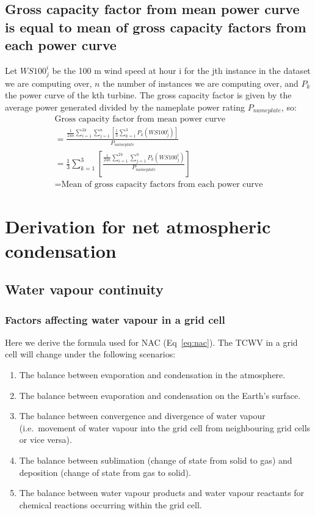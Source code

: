 \subsection[Gross capacity factor and mean power curve]{Gross capacity factor from mean power curve is equal to mean of gross capacity factors from each power curve}

Let $WS100^i_j$ be the 100 m wind speed at hour i for the jth instance in the dataset we are computing over, $n$ the number of instances we are computing over, and $P_k$ the power curve of the kth turbine. The gross capacity factor is given by the average power generated divided by the nameplate power rating $P_{nameplate}$, so:
\begin{eqnarray}
	\mbox{Gross capacity factor from mean power curve} \\
	= \frac{\frac{1}{24n} \sum_{i=1}^{24} \sum_{j=1}^{n} \left[\frac{1}{3} \sum_{k=1}^{3} P_k (WS100^i_j) \right]}{P_{nameplate}} \nonumber \\
	= \frac{1}{3} \sum_{k=1}^{3} \left[ \frac{\frac{1}{24n} \sum_{i=1}^{24} \sum_{j=1}^{n} P_k (WS100^i_j)}{P_{nameplate}} \right] \nonumber \\
	= \mbox{Mean of gross capacity factors from each power curve} \nonumber
\end{eqnarray}

\section{Derivation for net atmospheric condensation}
\label{sec:nac_derive}

\subsection{Water vapour continuity}

\subsubsection{Factors affecting water vapour in a grid cell}

Here we derive the formula used for \ac{NAC} (Eq~\ref{eq:nac}). The \ac{TCWV} in a grid cell will change under the following scenarios:
\begin{enumerate}
	\item The balance between evaporation and condensation in the atmosphere.
	\item The balance between evaporation and condensation on the Earth's surface.
	\item The balance between convergence and divergence of water vapour (i.e.\ movement of water vapour into the grid cell from neighbouring grid cells or vice versa).
	\item The balance between sublimation (change of state from solid to gas) and deposition (change of state from gas to solid).
	\item The balance between water vapour products and water vapour reactants for chemical reactions occurring within the grid cell.
\end{enumerate}

